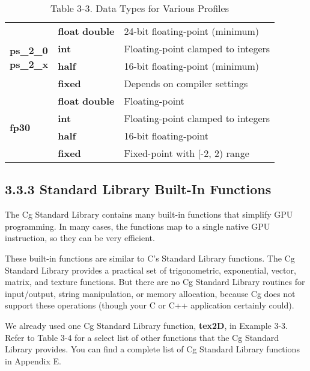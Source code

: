 \documentclass[../main.tex]{subfiles}
\begin{document}
\begin{table}
\begin{tabular}{ p{2cm} p{2cm} p{7cm}  }
\multirow{4}{4em}{\textbf{ps_2_0} \newline \textbf{ps_2_x}} & \textbf{float} \newline \textbf{double} & 24-bit floating-point (minimum)\\
\cline{2-3}
& \textbf{int} & Floating-point clamped to integers \\
\cline{2-3}
& \textbf{half} & 16-bit floating-point (minimum) \\
\cline{2-3}
& \textbf{fixed} & Depends on compiler settings\\
\hline

\multirow{4}{4em}{\textbf{fp30}} & \textbf{float} \newline \textbf{double} & Floating-point \\
\cline{2-3}
& \textbf{int} & Floating-point clamped to integers \\
\cline{2-3}
& \textbf{half} & 16-bit floating-point \\
\cline{2-3}
& \textbf{fixed} & Fixed-point with [-2, 2) range \\
\hline

\end{tabular}

\caption{Table 3-3. Data Types for Various Profiles}
\label{table:3-3}
\end{table}

\subsection{3.3.3 Standard Library Built-In Functions}

The Cg Standard Library contains many built-in functions that simplify GPU programming. In many cases, the functions map to a single native GPU instruction, so they can be very efficient.

These built-in functions are similar to C's Standard Library functions. The Cg Standard Library provides a practical set of trigonometric, exponential, vector, matrix, and texture functions. But there are no Cg Standard Library routines for input/output, string manipulation, or memory allocation, because Cg does not support these operations (though your C or C++ application certainly could).

We already used one Cg Standard Library function, \textbf{tex2D}, in Example 3-3. Refer to Table 3-4 for a select list of other functions that the Cg Standard Library provides. You can find a complete list of Cg Standard Library functions in Appendix E.
\end{document}
